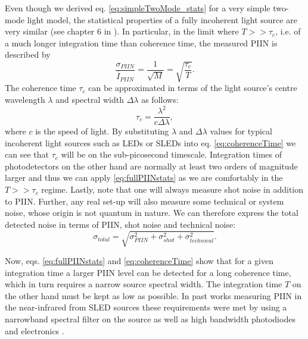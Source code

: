 \documentclass[]{article}
\newcommand*\mean[1]{\overline{#1}}
\begin{document}
	Even though we derived  eq. \ref{eq:simpleTwoMode_stats} for a very simple two-mode light model, the statistical properties of a fully incoherent light source are very similar (see chapter 6 in \cite{goodman_statistical_2000}). In particular, in the limit where $T>>\tau_c$, i.e. of a much longer integration time than coherence time, the measured PIIN is described by
		\begin{equation} 
		\frac{\sigma_{PIIN}}{\mean{I}_{PIIN}} = \frac{1}{\sqrt{M}} = \sqrt{\frac{\tau_c}{T}}.
		\label{eq:fullPIINstats}
		\end{equation}
	The coherence time $\tau_c$ can be approximated in terms of the light source's centre wavelength $\lambda$ and spectral width $\Delta\lambda$ as follows:
		\begin{equation}
		\tau_c = \frac{\lambda^2}{c\Delta\lambda},
		\label{eq:coherenceTime}
		\end{equation}
	where $c$ is the speed of light. By substituting $\lambda$ and $\Delta\lambda$ values for typical incoherent light sources such as LEDs or SLEDs into eq. \ref{eq:coherenceTime} we can see that $\tau_c$ will be on the sub-picosecond timescale. Integration times of photodetectors on the other hand are normally at least two orders of magnitude larger and thus we can apply \ref{eq:fullPIINstats} as we are comfortably in the $T>>\tau_c$ regime. Lastly, note that one will always measure shot noise in addition to PIIN. Further, any real set-up will also measure some technical or system noise, whose origin is not quantum in nature. We can therefore express the total detected noise in terms of PIIN, shot noise and technical noise:
		\begin{equation}
		\sigma_{total} = \sqrt{\sigma_{PIIN}^2 + \sigma_{shot}^2 + \sigma_{technical}^2}.
		\label{eq:noiseContributions}
		\end{equation}

	Now, eqs. \ref{eq:fullPIINstats} and \ref{eq:coherenceTime} show that for a given integration time a larger PIIN level can be detected for a long coherence time, which in turn requires a narrow source spectral width. The integration time $T$ on the other hand must be kept as low as possible. In past works measuring PIIN in the near-infrared from SLED sources these requirements were met by using a narrowband spectral filter on the source as well as high bandwidth photodiodes and electronics \cite{huang_real-time_2014, li_scalable_2011}.
\end{document}

